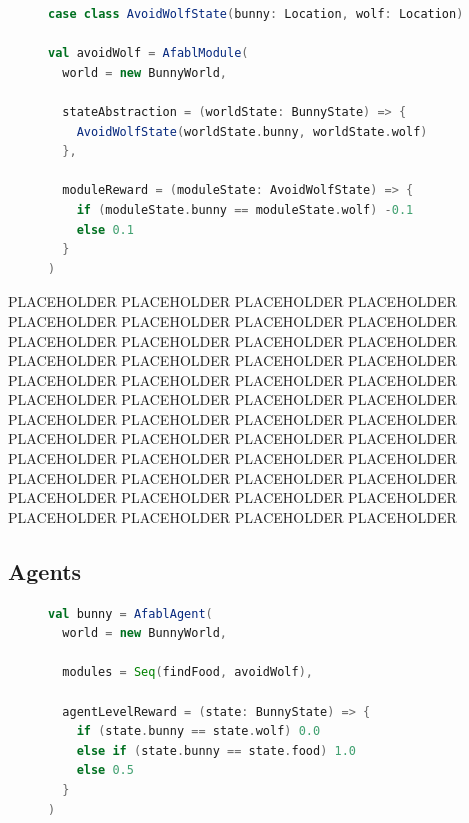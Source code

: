 \begin{figure}[ht]
\begin{center}

\begin{lstlisting}[language=Scala]
case class AvoidWolfState(bunny: Location, wolf: Location)

val avoidWolf = AfablModule(
  world = new BunnyWorld,

  stateAbstraction = (worldState: BunnyState) => {
    AvoidWolfState(worldState.bunny, worldState.wolf)
  },

  moduleReward = (moduleState: AvoidWolfState) => {
    if (moduleState.bunny == moduleState.wolf) -0.1
    else 0.1
  }
)
\end{lstlisting}

\caption{}
\end{center}
\label{fig:avoid-wolf-code}
\end{figure}



PLACEHOLDER PLACEHOLDER PLACEHOLDER PLACEHOLDER PLACEHOLDER PLACEHOLDER PLACEHOLDER PLACEHOLDER PLACEHOLDER PLACEHOLDER PLACEHOLDER PLACEHOLDER PLACEHOLDER PLACEHOLDER PLACEHOLDER PLACEHOLDER PLACEHOLDER PLACEHOLDER PLACEHOLDER PLACEHOLDER PLACEHOLDER PLACEHOLDER PLACEHOLDER PLACEHOLDER PLACEHOLDER PLACEHOLDER PLACEHOLDER PLACEHOLDER PLACEHOLDER PLACEHOLDER PLACEHOLDER PLACEHOLDER PLACEHOLDER PLACEHOLDER PLACEHOLDER PLACEHOLDER PLACEHOLDER PLACEHOLDER PLACEHOLDER PLACEHOLDER PLACEHOLDER PLACEHOLDER PLACEHOLDER PLACEHOLDER PLACEHOLDER PLACEHOLDER PLACEHOLDER PLACEHOLDER

\subsection{Agents}

\begin{figure}[ht]
\begin{center}

\begin{lstlisting}[language=Scala]
val bunny = AfablAgent(
  world = new BunnyWorld,

  modules = Seq(findFood, avoidWolf),

  agentLevelReward = (state: BunnyState) => {
    if (state.bunny == state.wolf) 0.0
    else if (state.bunny == state.food) 1.0
    else 0.5
  }
)
\end{lstlisting}

\caption{}
\end{center}
\label{fig:avoid-wolf-code}
\end{figure}


